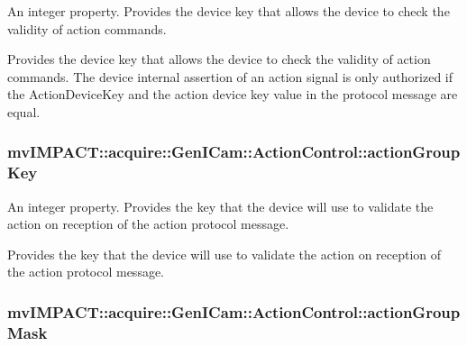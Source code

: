 An integer property. Provides the device key that allows the device to check the validity of action commands. 

Provides the device key that allows the device to check the validity of action commands. The device internal assertion of an action signal is only authorized if the Action\+Device\+Key and the action device key value in the protocol message are equal. \hypertarget{classmv_i_m_p_a_c_t_1_1acquire_1_1_gen_i_cam_1_1_action_control_afc67a158b9993fb82100fc0b65f0ba4f}{
\subsubsection[{action\+Group\+Key}]{ mv\+I\+M\+P\+A\+C\+T\+::acquire\+::\+Gen\+I\+Cam\+::\+Action\+Control\+::action\+Group\+Key}}\label{classmv_i_m_p_a_c_t_1_1acquire_1_1_gen_i_cam_1_1_action_control_afc67a158b9993fb82100fc0b65f0ba4f}


An integer property. Provides the key that the device will use to validate the action on reception of the action protocol message. 

Provides the key that the device will use to validate the action on reception of the action protocol message. \hypertarget{classmv_i_m_p_a_c_t_1_1acquire_1_1_gen_i_cam_1_1_action_control_ad28ef9aae758a7b229bf34268ab88e74}{
\subsubsection[{action\+Group\+Mask}]{ mv\+I\+M\+P\+A\+C\+T\+::acquire\+::\+Gen\+I\+Cam\+::\+Action\+Control\+::action\+Group\+Mask}}\label{classmv_i_m_p_a_c_t_1_1acquire_1_1_gen_i_cam_1_1_action_control_ad28ef9aae758a7b229bf34268ab88e74}


